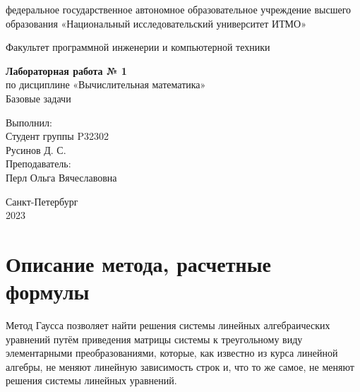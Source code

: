 \documentclass[12pt]{article}
\begin{document}
\begin{center}
    федеральное государственное автономное образовательное учреждение высшего образования «Национальный исследовательский университет ИТМО»
\end{center}
\vspace{0,5cm}

\begin{center}
Факультет программной инженерии и компьютерной техники
\end{center}

\vspace{1cm}


\begin{center}

    \textbf{Лабораторная работа № 1}\\
    по дисциплине «Вычислительная математика» \\
    Базовые задачи \\

\end{center}

\vspace{12cm}

\begin{flushright}
    Выполнил:\\
    Студент группы P32302 \\
    Русинов Д. С.\\
    Преподаватель: \\
    Перл Ольга Вячеславовна \\
\end{flushright}

\vspace{3cm}

\begin{center}
    Санкт-Петербург\\
    2023
\end{center}

\newpage
{} %

\tableofcontents

\newpage
\section{Описание метода, расчетные формулы}
Метод Гаусса позволяет найти решения системы линейных алгебраических уравнений путём приведения матрицы системы к треугольному виду элементарными преобразованиями, которые, как известно из курса линейной алгебры, не меняют линейную зависимость строк и, что то же самое, не меняют решения системы линейных уравнений.
\end{document}

